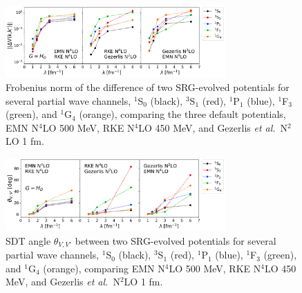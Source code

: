 \documentclass[10pt,aps,prc,floatfix,twocolumn,nofootinbib]{revtex4-1}
\begin{document}
%
\begin{figure}[tbh]
    \includegraphics[clip,clip,width=0.75\textwidth]{universality_test_with_norm_kvnns_79_111_222_channels_1S0_3S1_1P1_1F3_1G4_Wegner.pdf}%
    \caption{Frobenius norm of the difference of two SRG-evolved potentials for several partial wave channels, $^1$S$_0$ (black), $^3$S$_1$ (red), $^1$P$_1$ (blue), $^1$F$_3$ (green), and $^1$G$_4$ (orange), comparing the three default potentials, EMN N$^4$LO 500 MeV, RKE N$^4$LO 450 MeV, and Gezerlis \textit{et al.}~N$^2$LO 1 fm.}
    \label{fig:universality_test_with_norm_Wegner}
\end{figure}
%
\begin{figure}[tbh]
    \includegraphics[clip,clip,width=0.75\textwidth]{universality_test_with_sdt_coeff_kvnns_79_111_222_channels_1S0_3S1_1P1_1F3_1G4_Wegner.pdf}%
    \caption{SDT angle $\theta_{V,V'}$ between two SRG-evolved potentials for several partial wave channels, $^1$S$_0$ (black), $^3$S$_1$ (red), $^1$P$_1$ (blue), $^1$F$_3$ (green), and $^1$G$_4$ (orange), comparing EMN N$^4$LO 500 MeV, RKE N$^4$LO 450 MeV, and Gezerlis \textit{et al.}~N$^2$LO 1 fm.}
    \label{fig:universality_test_with_sdt_coeff_Wegner}
\end{figure}
%
\end{document}
